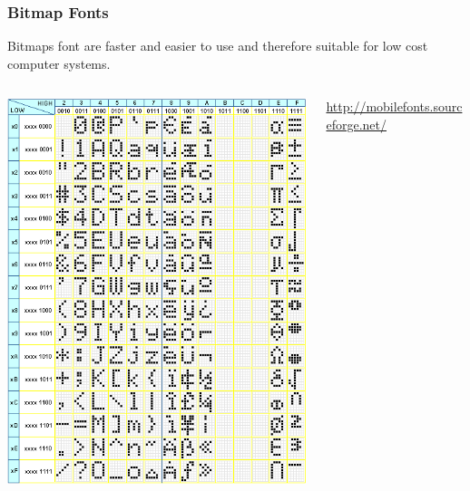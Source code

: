 \documentclass{beamer}
\begin{document}
\begin{frame}
\frametitle{Bitmap Fonts}

Bitmaps font are faster and easier to use and therefore suitable for low cost computer systems. 

\begin{columns}
\begin{column}{0.35\textwidth}
  \begin{center}
    \includegraphics[width=1.0\textwidth]{fig/bitmap-font-encoding-table.png}
  \end{center}
  \vfil
\end{column}
\begin{column}{0.55\textwidth}
  \begin{center}
    \tiny{\url{http://mobilefonts.sourceforge.net/}}


\end{center}
\end{column}
\end{columns}
\end{frame}
\end{document}
